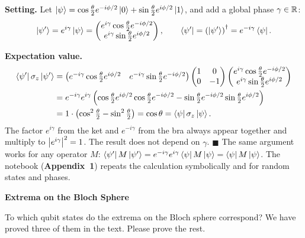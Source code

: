 \documentclass[a4paper, 10pt]{article}
\begin{document}
\begin{solution}
	\noindent \textbf{Setting.} Let \( \ket{\psi} = \cos\tfrac{\theta}{2}e^{-i\phi/2}\ket{0} + \sin\tfrac{\theta}{2}e^{i\phi/2}\ket{1} \), and add a global phase \( \gamma \in \mathbb{R} \):
	\[
		\ket{\psi'} = e^{i\gamma}\ket{\psi} = \begin{pmatrix} e^{i\gamma}\cos\frac{\theta}{2}e^{-i\phi/2} \\ e^{i\gamma}\sin\frac{\theta}{2}e^{i\phi/2} \end{pmatrix}, \qquad
		\bra{\psi'} = \left(\ket{\psi'}\right)^{\dagger} = e^{-i\gamma}\bra{\psi}.
	\]

	\myspace

	\noindent \textbf{Expectation value.}
	\begin{align*}
		\bra{\psi'}\sigma_z\ket{\psi'}
		 & = \begin{pmatrix} e^{-i\gamma}\cos\frac{\theta}{2}e^{i\phi/2} & e^{-i\gamma}\sin\frac{\theta}{2}e^{-i\phi/2} \end{pmatrix}
		\begin{pmatrix} 1 & 0 \\ 0 & -1 \end{pmatrix}
		\begin{pmatrix} e^{i\gamma}\cos\frac{\theta}{2}e^{-i\phi/2} \\ e^{i\gamma}\sin\frac{\theta}{2}e^{i\phi/2} \end{pmatrix}                                    \\
		 & = e^{-i\gamma}e^{i\gamma}\left(\cos\tfrac{\theta}{2}e^{i\phi/2}\cos\tfrac{\theta}{2}e^{-i\phi/2} - \sin\tfrac{\theta}{2}e^{-i\phi/2}\sin\tfrac{\theta}{2}e^{i\phi/2}\right) \\
		 & = 1 \cdot \left(\cos^2\tfrac{\theta}{2} - \sin^2\tfrac{\theta}{2}\right) = \cos\theta = \bra{\psi}\sigma_z\ket{\psi}.
	\end{align*}
	The factor \( e^{i\gamma} \) from the ket and \( e^{-i\gamma} \) from the bra always appear together and multiply to \( \left|e^{i\gamma}\right|^2 = 1 \). The result does not depend on \( \gamma \). \( \blacksquare \)
	The same argument works for any operator \( M \): \( \bra{\psi'}M\ket{\psi'} = e^{-i\gamma}e^{i\gamma}\bra{\psi}M\ket{\psi} = \bra{\psi}M\ket{\psi} \).
	The notebook (\textbf{Appendix~1}) repeats the calculation symbolically and for random states and phases.
\end{solution}

\begin{problem}
\textbf{Extrema on the Bloch Sphere}
\par To which qubit states do the extrema on the Bloch sphere correspond?
We have proved three of them in the text.
Please prove the rest.
\end{problem}
\end{document}
